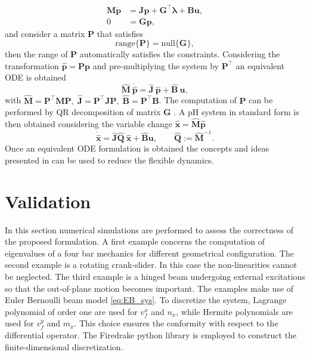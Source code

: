 \documentclass{svjour3}                     %
\begin{document}
\begin{equation}
\begin{aligned}
\mathbf{M} \dot{\mathbf{p}} &=  \mathbf{J}\mathbf{p} + \mathbf{G}^\top \bm{\lambda} + \mathbf{B}\mathbf{u}, \\ 
0 &= \mathbf{G}\mathbf{p},
\end{aligned}
\end{equation}
and consider a matrix $\mathbf{P}$ that satisfies 
\[
\mathrm{range}\{\mathbf{P}\} = \mathrm{null}\{\mathbf{G}\},
\]
then the range of $\mathbf{P}$ automatically satisfies the constraints. Considering the transformation $\widehat{\mathbf{p}} = \mathbf{P} \mathbf{p}$ and pre-multiplying the system by $\mathbf{P}^\top$ an equivalent ODE is obtained
\[
\widehat{\mathbf{M}} \ \dot{\widehat{\mathbf{p}}} =  \widehat{\mathbf{J}} \ \widehat{\mathbf{p}} + \widehat{\mathbf{B}} \ \mathbf{u},
\]
with $\widehat{\mathbf{M}} = \mathbf{P}^\top \mathbf{M} \mathbf{P}, \; \widehat{\mathbf{J}} = \mathbf{P}^\top \mathbf{J} \mathbf{P}, \; \widehat{\mathbf{B}} = \mathbf{P}^\top \mathbf{B}$. The computation of $\mathbf{P}$ can be performed by QR decomposition of matrix $\mathbf{G}$ \cite{nullspaceFlMult}. A pH system in standard form is then obtained considering the variable change $\widehat{\mathbf{x}} = \widehat{\mathbf{M}} \widehat{\mathbf{p}}$
\[ \dot{\widehat{\mathbf{x}}} =  \widehat{\mathbf{J}} \widehat{\mathbf{Q}}\ \widehat{\mathbf{x}} + \widehat{\mathbf{B}}  \mathbf{u}, \qquad \widehat{\mathbf{Q}}:= \widehat{\mathbf{M}}^{-1}.
\] 
Once an equivalent ODE formulation is obtained the concepts and ideas presented in \cite{phode_red} can be used to reduce the flexible dynamics.

\section{Validation}
\label{sec:valid}

In this section numerical simulations are performed to assess the correctness of the proposed formulation. A first example concerns the computation of eigenvalues of a four bar mechanics for different geometrical configuration. The second example is a rotating crank-slider. In this case the non-linearities cannot be neglected. The third example is a hinged beam undergoing external excitations so that the out-of-plane motion becomes important. The examples make use of Euler Bernoulli beam model \eqref{eq:EB_sys}. To discretize the system, Lagrange polynomial of order one are used for $v_f^x$ and $n_x$, while Hermite polynomials are used for $v_f^y$ and $m_{x}$. This choice ensures the conformity with respect to the differential operator. The Firedrake python library \cite{rathgeber2017firedrake} is employed to construct the finite-dimensional discretization.  
\end{document}

